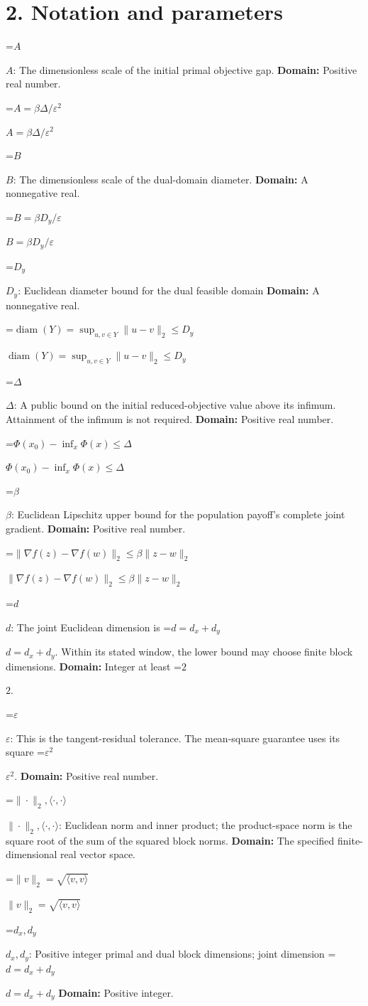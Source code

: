\documentclass[10pt,a4paper]{article}
\newcommand{\AtlasMath}[1]{\par\begingroup\centering\setbox0=\hbox{$\displaystyle #1$}\ifdim\wd0>1.4\linewidth\typeout{ATLAS WIDE FORMULA: \the\wd0}\fi\ifdim\wd0>\linewidth\resizebox{\linewidth}{!}{\box0}\else\box0\fi\par\endgroup}
\newcommand{\AtlasInlineMath}[1]{\begingroup\setbox0=\hbox{$#1$}\ifdim\wd0>.4\linewidth\endgroup\AtlasMath{#1}\else\endgroup$#1$\fi}
\begin{document}
\section{2. Notation and parameters}
\AtlasInlineMath{A}: The dimensionless scale of the initial primal objective gap. \textbf{Domain:} Positive real number.

\AtlasInlineMath{A=\beta\Delta/\varepsilon^2}

\AtlasInlineMath{B}: The dimensionless scale of the dual-domain diameter. \textbf{Domain:} A nonnegative real.

\AtlasInlineMath{B=\beta D_y/\varepsilon}

\AtlasInlineMath{D_y}: Euclidean diameter bound for the dual feasible domain \textbf{Domain:} A nonnegative real.

\AtlasInlineMath{\operatorname{diam}(Y)=\sup_{u,v\in Y}\|u-v\|_2\le D_y}

\AtlasInlineMath{\Delta}: A public bound on the initial reduced-objective value above its infimum. Attainment of the infimum is not required. \textbf{Domain:} Positive real number.

\AtlasInlineMath{\Phi(x_0)-\inf_x\Phi(x)\le\Delta}

\AtlasInlineMath{\beta}: Euclidean Lipschitz upper bound for the population payoff's complete joint gradient. \textbf{Domain:} Positive real number.

\AtlasInlineMath{\|\nabla f(z)-\nabla f(w)\|_2\le\beta\|z-w\|_2}

\AtlasInlineMath{d}: The joint Euclidean dimension is \AtlasInlineMath{d=d_x+d_y}. Within its stated window, the lower bound may choose finite block dimensions. \textbf{Domain:} Integer at least \AtlasInlineMath{2}.

\AtlasInlineMath{\varepsilon}: This is the tangent-residual tolerance. The mean-square guarantee uses its square \AtlasInlineMath{\varepsilon^2}. \textbf{Domain:} Positive real number.

\AtlasInlineMath{\|\cdot\|_2,\langle\cdot,\cdot\rangle}: Euclidean norm and inner product; the product-space norm is the square root of the sum of the squared block norms. \textbf{Domain:} The specified finite-dimensional real vector space.

\AtlasInlineMath{\|v\|_2=\sqrt{\langle v,v\rangle}}

\AtlasInlineMath{d_x,d_y}: Positive integer primal and dual block dimensions; joint dimension \AtlasInlineMath{d=d_x+d_y} \textbf{Domain:} Positive integer.
\end{document}
